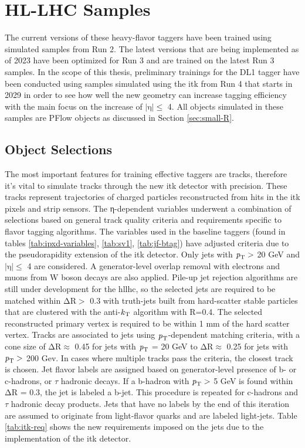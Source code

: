 \section{ HL-LHC Samples}

The current versions of these heavy-flavor taggers have been trained using simulated samples from Run 2. The latest versions that are being implemented as of 2023 have been 
optimized for Run 3 and are trained on the latest Run 3 samples. In the scope of this thesis, preliminary trainings for the DL1 tagger have been conducted using samples 
simulated using the \gls{itk} from Run 4 that starts in 2029 in order to see how well the new geometry can increase tagging efficiency with the main focus on the increase 
of $|\textrm{η}| \le$ 4. All objects simulated in these samples are PFlow objects as discussed in Section \ref{sec:small-R}.

\subsection{Object Selections}

The most important features for training effective taggers are tracks, therefore it's vital to simulate tracks through the new \gls{itk} detector with precision. These tracks represent 
trajectories of charged particles reconstructed from hits in the \gls{itk} pixels and strip sensors. The η-dependent variables underwent a combination of selections based on general track quality criteria and requirements 
specific to flavor tagging algorithms. The variables used in the baseline taggers (found in tables \ref{tab:ipxd-variables}, \ref{tab:sv1}, \ref{tab:jf-btag}) have adjusted criteria due to the 
pseudorapidity extension of the \gls{itk} detector. Only jets with $\textrm{\textit{p}}_{\textrm{T}} >$ 20 GeV and $|\textrm{η}| \le$ 4 are considered. A generator-level overlap removal with electrons 
and muons from W boson decays are also applied. Pile-up jet rejection algorithms are still under development for the \gls{hllhc}, so the selected jets are required to be matched within $∆\textrm{R} >$
0.3 with truth-jets built from hard-scatter stable particles that are clustered with the anti-$\textrm{\textit{k}}_{\textrm{T}}$ algorithm with R=0.4. The selected reconstructed primary vertex is required to be within 1 mm 
of the hard scatter vertex. Tracks are associated to jets using $\textrm{\textit{p}}_{\textrm{T}}$-dependent matching criteria, with a cone size of $∆\textrm{R} \approx$ 0.45 for jets with $\textrm{\textit{p}}_{\textrm{T}}$
= 20 GeV to $∆\textrm{R} \approx$ 0.25 for jets with $\textrm{\textit{p}}_{\textrm{T}} >$ 200 Gev. In cases where multiple tracks pass the criteria, the closest track is chosen. Jet flavor labels are assigned 
based on generator-level presence of b- or c-hadrons, or $\tau$ hadronic decays. If a b-hadron with $\textrm{\textit{p}}_{\textrm{T}} >$ 5 GeV is found within $∆\textrm{R}$ = 0.3, the jet is labeled a b-jet. 
This procedure is repeated for c-hadrons and $\tau$ hadronic decay products. Jets that have no labels by the end of this iteration are assumed to originate from light-flavor quarks and 
are labeled light-jets. Table \ref{tab:itk-req} shows the new requirements imposed on the jets due to the implementation of the \gls{itk} detector.

